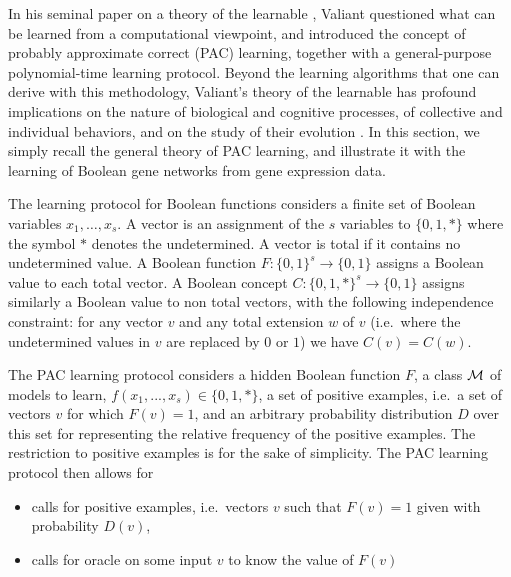 \documentclass[graybox]{svmult}
\begin{document}
In his seminal paper on a theory of the learnable \cite{Valiant84cacm},
Valiant questioned what can be learned from a computational viewpoint,
and introduced the concept of probably approximate correct (PAC) learning,
together with a general-purpose polynomial-time learning protocol.
Beyond the learning algorithms that one can derive with this methodology,
Valiant's theory of the learnable has profound implications
on the nature of biological and cognitive processes,
of collective and individual behaviors,
and on the study of their evolution \cite{Valiant13book}.
In this section, we simply recall the general theory of PAC learning,
and illustrate it with the learning of Boolean gene networks from gene expression data.

The learning protocol for Boolean functions considers
a finite set of Boolean variables $x_1,\ldots,x_s$.
A vector is an assignment of the $s$ variables to $\{0,1,*\}$
where the symbol $*$ denotes the undetermined.
A vector is total if it contains no undetermined value.
A Boolean function $F:\{0,1\}^s \rightarrow\{0,1\}$
assigns a Boolean value to each total vector.
A Boolean concept $C:\{0,1,*\}^s \rightarrow\{0,1\}$
assigns similarly a Boolean value to non total vectors,
with the following independence constraint:
for any vector $v$ and any total extension $w$ of $v$ (i.e.~where the undetermined values in $v$ are replaced by $0$ or $1$)
we have $C(v)=C(w)$.

The PAC learning protocol considers a hidden Boolean function $F$,
a class $\cal M$ of models to learn, $f(x_1,...,x_s) \in \{0,1,*\}$,
a set of positive examples, i.e.~a set of vectors $v$ for which $F(v)=1$,
and an arbitrary probability distribution $D$ over this set
for representing the relative frequency of the positive examples.
The restriction to positive examples is for the sake of simplicity.
The PAC learning protocol then allows for
\begin{itemize}
  \item
calls for positive examples, i.e.~vectors $v$ such that $F(v)=1$ given with probability $D(v)$,
  \item
calls for oracle on some input $v$ to know the value of $F(v)$
\end{itemize}
\end{document}
